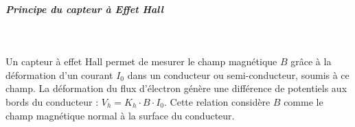\documentclass[11pt, french]{article} %
\begin{document}
\subparagraph*{Principe du capteur à Effet Hall}~\\
\begin{minipage}[t]{10cm}
\vspace{-0.3cm}
Un capteur à effet Hall permet de mesurer le champ magnétique $B$ grâce à la déformation d'un courant $I_0$ dans un conducteur ou semi-conducteur, soumis à ce champ. La déformation du flux d'électron génère une différence de potentiels aux bords du conducteur : $V_h =K_h \cdot B \cdot I_0$. Cette relation considère $B$ comme le champ magnétique normal à la surface du conducteur.
\end{minipage}
\end{document}
